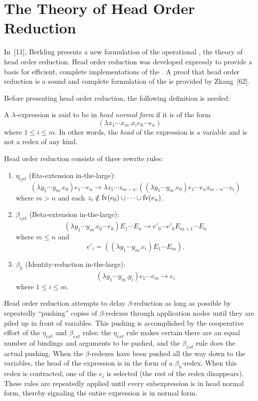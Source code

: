 \section{The Theory of Head Order Reduction}

In~[11], Berkling presents a new formulation of the operational
\lambdacalculus, the theory of head order reduction. Head order reduction was
developed expressly to provide a basis for efficient, complete implementations
of the \lambdacalculus. A proof that head order reduction is a sound and
complete formulation of the \lambdacalculus{} is provided by Zhang~[62].

Before presenting head order reduction, the following definition is needed:

\begin{definition}
A \(\lambda\)-expression is said to be in \emph{head normal form} if it is of
the form
\[
(\lambda x_1\cdots x_m.x_i e_0\cdots e_n)
\]
where \(1 \le i \le m\). In other words, the \emph{head} of the expression is a
variable and is not a redex of any kind.
\end{definition}

Head order reduction consists of three rewrite rules:

\begin{enumerate}
\item \(\underline{\eta_{ext}}\) (Eta-extension in-the-large):
\[
(\lambda y_1\cdots y_m.e_0)e_1\cdots e_n
\longrightarrow
\lambda z_1\cdots z_{m-n}.((\lambda y_1\cdots y_m.e_0)e_1\cdots e_n
z_{m-n}\cdots z_1)
\]
where \(m > n\) and each \(z_i \notin \operatorname{fv}(e_0)\cup\cdots\cup\operatorname{fv}(e_n)\).

\item \(\underline{\beta_{ext}}\) (Beta-extension in-the-large):
\[
(\lambda y_1\cdots y_m.e_0\cdots e_k)E_1\cdots E_n
\longrightarrow
e'_0\cdots e'_k E_{m+1}\cdots E_n
\]
where \(m \le n\) and
\[
e'_i=((\lambda y_1\cdots y_m.e_i)E_1\cdots E_m).
\]

\item \(\underline{\beta_h}\) (Identity-reduction in-the-large):
\[
(\lambda y_1\cdots y_m.y_i)e_1\cdots e_m \longrightarrow e_i
\]
where \(1 \le i \le m\).
\end{enumerate}

Head order reduction attempts to delay \(\beta\)-reduction as long as possible
by repeatedly ``pushing'' copies of \(\beta\)-redexes through application nodes
until they are piled up in front of variables. This pushing is accomplished by
the cooperative effort of the \(\eta_{ext}\) and \(\beta_{ext}\) rules: the
\(\eta_{ext}\) rule makes certain there are an equal number of bindings and
arguments to be pushed, and the \(\beta_{ext}\) rule does the actual pushing.
When the \(\beta\)-redexes have been pushed all the way down to the variables,
the head of the expression is in the form of a \(\beta_h\)-redex. When this
redex is contracted, one of the \(e_i\) is selected (the rest of the redex
disappears). These rules are repeatedly applied until every subexpression is in
head normal form, thereby signaling the entire expression is in normal form.

